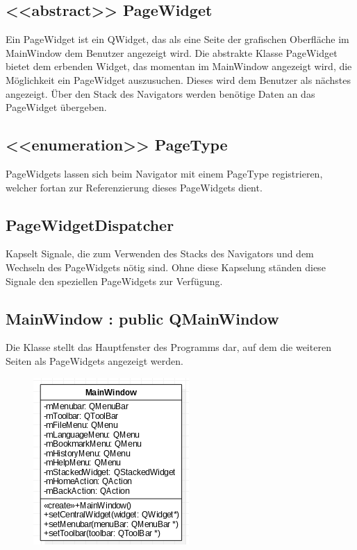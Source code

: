 \subsection*{<<abstract>> PageWidget}
Ein PageWidget ist ein QWidget, das als eine Seite der grafischen Oberfläche im MainWindow dem Benutzer angezeigt wird. Die abstrakte Klasse PageWidget bietet dem erbenden Widget, das momentan im MainWindow angezeigt wird, die Möglichkeit ein PageWidget auszusuchen. Dieses wird dem Benutzer als nächstes angezeigt. Über den Stack des Navigators werden benötige Daten an das PageWidget übergeben.

\subsection*{<<enumeration>> PageType}
PageWidgets lassen sich beim Navigator mit einem PageType registrieren, welcher fortan zur Referenzierung dieses PageWidgets dient.

\subsection*{PageWidgetDispatcher}
Kapselt Signale, die zum Verwenden des Stacks des Navigators und dem Wechseln des PageWidgets nötig sind. Ohne diese Kapselung ständen diese Signale den speziellen PageWidgets zur Verfügung.

\subsection*{MainWindow : public QMainWindow}
Die Klasse stellt das Hauptfenster des Programms dar, auf dem die weiteren Seiten als PageWidgets angezeigt werden.

\begin{figure}[H]
	\centering
	\includegraphics[scale=0.5]{img/Klassendiagramm/Klassen/View/MainWindow}
	\label{fig:mainWindow}
\end{figure}

